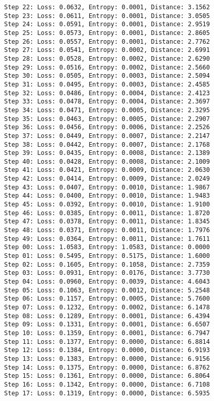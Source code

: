 \documentclass[11pt]{article}
\begin{document}
\begin{Verbatim}[commandchars=\\\{\}]
Step 22: Loss: 0.0632, Entropy: 0.0001, Distance: 3.1562
Step 23: Loss: 0.0611, Entropy: 0.0001, Distance: 3.0505
Step 24: Loss: 0.0591, Entropy: 0.0001, Distance: 2.9519
Step 25: Loss: 0.0573, Entropy: 0.0001, Distance: 2.8605
Step 26: Loss: 0.0557, Entropy: 0.0001, Distance: 2.7762
Step 27: Loss: 0.0541, Entropy: 0.0002, Distance: 2.6991
Step 28: Loss: 0.0528, Entropy: 0.0002, Distance: 2.6290
Step 29: Loss: 0.0516, Entropy: 0.0002, Distance: 2.5660
Step 30: Loss: 0.0505, Entropy: 0.0003, Distance: 2.5094
Step 31: Loss: 0.0495, Entropy: 0.0003, Distance: 2.4585
Step 32: Loss: 0.0486, Entropy: 0.0004, Distance: 2.4123
Step 33: Loss: 0.0478, Entropy: 0.0004, Distance: 2.3697
Step 34: Loss: 0.0471, Entropy: 0.0005, Distance: 2.3295
Step 35: Loss: 0.0463, Entropy: 0.0005, Distance: 2.2907
Step 36: Loss: 0.0456, Entropy: 0.0006, Distance: 2.2526
Step 37: Loss: 0.0449, Entropy: 0.0007, Distance: 2.2147
Step 38: Loss: 0.0442, Entropy: 0.0007, Distance: 2.1768
Step 39: Loss: 0.0435, Entropy: 0.0008, Distance: 2.1389
Step 40: Loss: 0.0428, Entropy: 0.0008, Distance: 2.1009
Step 41: Loss: 0.0421, Entropy: 0.0009, Distance: 2.0630
Step 42: Loss: 0.0414, Entropy: 0.0009, Distance: 2.0249
Step 43: Loss: 0.0407, Entropy: 0.0010, Distance: 1.9867
Step 44: Loss: 0.0400, Entropy: 0.0010, Distance: 1.9483
Step 45: Loss: 0.0392, Entropy: 0.0010, Distance: 1.9100
Step 46: Loss: 0.0385, Entropy: 0.0011, Distance: 1.8720
Step 47: Loss: 0.0378, Entropy: 0.0011, Distance: 1.8345
Step 48: Loss: 0.0371, Entropy: 0.0011, Distance: 1.7976
Step 49: Loss: 0.0364, Entropy: 0.0011, Distance: 1.7611
Step 00: Loss: 1.0583, Entropy: 1.0583, Distance: 0.0000
Step 01: Loss: 0.5495, Entropy: 0.5175, Distance: 1.6000
Step 02: Loss: 0.1605, Entropy: 0.1058, Distance: 2.7359
Step 03: Loss: 0.0931, Entropy: 0.0176, Distance: 3.7730
Step 04: Loss: 0.0960, Entropy: 0.0039, Distance: 4.6043
Step 05: Loss: 0.1063, Entropy: 0.0012, Distance: 5.2548
Step 06: Loss: 0.1157, Entropy: 0.0005, Distance: 5.7600
Step 07: Loss: 0.1232, Entropy: 0.0002, Distance: 6.1478
Step 08: Loss: 0.1289, Entropy: 0.0001, Distance: 6.4394
Step 09: Loss: 0.1331, Entropy: 0.0001, Distance: 6.6507
Step 10: Loss: 0.1359, Entropy: 0.0001, Distance: 6.7947
Step 11: Loss: 0.1377, Entropy: 0.0000, Distance: 6.8814
Step 12: Loss: 0.1384, Entropy: 0.0000, Distance: 6.9193
Step 13: Loss: 0.1383, Entropy: 0.0000, Distance: 6.9156
Step 14: Loss: 0.1375, Entropy: 0.0000, Distance: 6.8762
Step 15: Loss: 0.1361, Entropy: 0.0000, Distance: 6.8064
Step 16: Loss: 0.1342, Entropy: 0.0000, Distance: 6.7108
Step 17: Loss: 0.1319, Entropy: 0.0000, Distance: 6.5935

\end{Verbatim}
\end{document}
